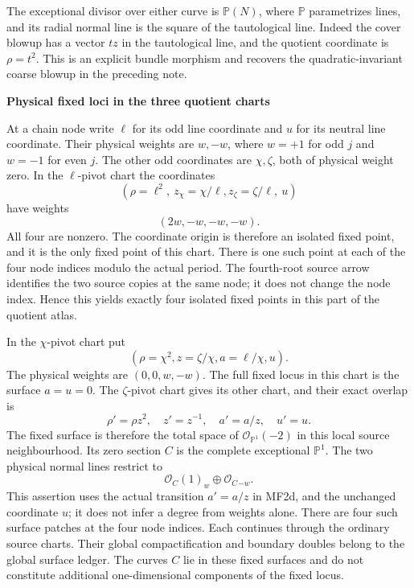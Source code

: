 The exceptional divisor over either curve is \(\mathbb P(N)\), where
\(\mathbb P\) parametrizes lines, and its radial normal line is the
square of the tautological line. Indeed the cover blowup has a vector
\(t z\) in the tautological line, and the quotient coordinate is
\(\rho=t^2\). This is an explicit bundle morphism and recovers the
quadratic-invariant coarse blowup in the preceding note.

\par

\medskip\noindent\textbf{Physical fixed loci in the three quotient charts}

\par\nobreak

At a chain node write \(\ell\) for its odd line coordinate and
\(u\) for its neutral line coordinate. Their physical weights are
\(w,-w\), where \(w=+1\) for odd \(j\) and \(w=-1\) for even
\(j\). The other odd coordinates are \(\chi,\zeta\), both of
physical weight zero. In the \(\ell\)-pivot chart the coordinates
\[
 (\rho=\ell^2,\ z_\chi=\chi/\ell,
 z_\zeta=\zeta/\ell,\ u)
\]
have weights
\[
 (2w,-w,-w,-w).
\tag{MF2c}
\]
All four are nonzero. The coordinate origin is therefore an isolated
fixed point, and it is the only fixed point of this chart. There is one
such point at each of the four node indices modulo the actual period.
The fourth-root source arrow identifies the two source copies at the
same node; it does not change the node index. Hence this yields exactly
four isolated fixed points in this part of the quotient atlas.

In the \(\chi\)-pivot chart put
\[
 (\rho=\chi^2,z=\zeta/\chi,a=\ell/\chi,u).
\]
The physical weights are \((0,0,w,-w)\). The full fixed locus in
this chart is the surface \(a=u=0\). The \(\zeta\)-pivot chart
gives its other chart, and their exact overlap is
\[
 \rho'=\rho z^2,\quad z'=z^{-1},\quad a'=a/z,\quad u'=u.
\tag{MF2d}
\]
The fixed surface is therefore the total space of
\(\mathcal O_{\mathbb P^1}(-2)\) in this local source
neighbourhood. Its zero section \(C\) is the complete exceptional
\(\mathbb P^1\). The two physical normal lines restrict to
\[
 \mathcal O_C(1)_{w}\oplus\mathcal O_C{}_{-w}.
\tag{MF2e}
\]
This assertion uses the actual transition \(a'=a/z\) in MF2d,
and the unchanged coordinate \(u\); it does not infer a degree from
weights alone. There are four such surface patches at the four node
indices. Each continues through the ordinary source charts. Their global
compactification and boundary doubles belong to the global surface
ledger. The curves \(C\) lie in these fixed surfaces and do not
constitute additional one-dimensional components of the fixed locus.

